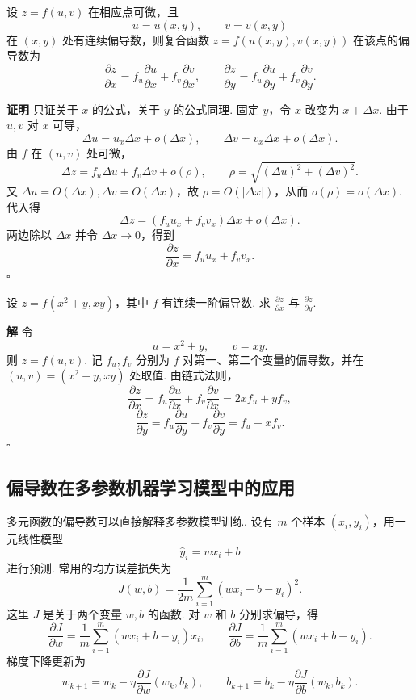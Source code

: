 \documentclass[fontset=fandol]{ctexart}
\newenvironment{proofdetail}{\par\noindent\textbf{证明}\quad}{\hfill$\square$\par\vspace{0.8em}}
\newenvironment{solution}{\par\noindent\textbf{解}\quad}{\hfill$\square$\par\vspace{0.8em}}
\begin{document}
\begin{theorem}
设 $z=f(u,v)$ 在相应点可微，且
\[
u=u(x,y),\qquad v=v(x,y)
\]
在 $(x,y)$ 处有连续偏导数，则复合函数 $z=f(u(x,y),v(x,y))$ 在该点的偏导数为
\[
\frac{\partial z}{\partial x}=f_u\frac{\partial u}{\partial x}+f_v\frac{\partial v}{\partial x},
\qquad
\frac{\partial z}{\partial y}=f_u\frac{\partial u}{\partial y}+f_v\frac{\partial v}{\partial y}.
\]
\end{theorem}
\begin{proofdetail}
只证关于 $x$ 的公式，关于 $y$ 的公式同理. 固定 $y$，令 $x$ 改变为 $x+\Delta x$. 由于 $u,v$ 对 $x$ 可导，
\[
\Delta u=u_x\Delta x+o(\Delta x),\qquad
\Delta v=v_x\Delta x+o(\Delta x).
\]
由 $f$ 在 $(u,v)$ 处可微，
\[
\Delta z=f_u\Delta u+f_v\Delta v+o(\rho),
\qquad \rho=\sqrt{(\Delta u)^2+(\Delta v)^2}.
\]
又 $\Delta u=O(\Delta x),\Delta v=O(\Delta x)$，故 $\rho=O(|\Delta x|)$，从而 $o(\rho)=o(\Delta x)$. 代入得
\[
\Delta z=(f_u u_x+f_v v_x)\Delta x+o(\Delta x).
\]
两边除以 $\Delta x$ 并令 $\Delta x\to0$，得到
\[
\frac{\partial z}{\partial x}=f_u u_x+f_v v_x.
\]
\end{proofdetail}

\begin{example}[二元复合函数偏导]
设 $z=f(x^2+y,xy)$，其中 $f$ 有连续一阶偏导数. 求 $\frac{\partial z}{\partial x}$ 与 $\frac{\partial z}{\partial y}$.
\end{example}
\begin{solution}
令
\[
u=x^2+y,\qquad v=xy.
\]
则 $z=f(u,v)$. 记 $f_u,f_v$ 分别为 $f$ 对第一、第二个变量的偏导数，并在 $(u,v)=(x^2+y,xy)$ 处取值. 由链式法则，
\[
\frac{\partial z}{\partial x}
=f_u\frac{\partial u}{\partial x}+f_v\frac{\partial v}{\partial x}
=2x f_u+y f_v,
\]
\[
\frac{\partial z}{\partial y}
=f_u\frac{\partial u}{\partial y}+f_v\frac{\partial v}{\partial y}
=f_u+x f_v.
\]
\end{solution}


\subsection{偏导数在多参数机器学习模型中的应用}

多元函数的偏导数可以直接解释多参数模型训练. 设有 $m$ 个样本 $(x_i,y_i)$，用一元线性模型
\[
\hat y_i=wx_i+b
\]
进行预测. 常用的均方误差损失为
\[
J(w,b)=\frac{1}{2m}\sum_{i=1}^{m}(wx_i+b-y_i)^2.
\]
这里 $J$ 是关于两个变量 $w,b$ 的函数. 对 $w$ 和 $b$ 分别求偏导，得
\[
\frac{\partial J}{\partial w}
=\frac{1}{m}\sum_{i=1}^{m}(wx_i+b-y_i)x_i,
\qquad
\frac{\partial J}{\partial b}
=\frac{1}{m}\sum_{i=1}^{m}(wx_i+b-y_i).
\]
梯度下降更新为
\[
w_{k+1}=w_k-\eta\frac{\partial J}{\partial w}(w_k,b_k),\qquad
b_{k+1}=b_k-\eta\frac{\partial J}{\partial b}(w_k,b_k).
\]
\end{document}
